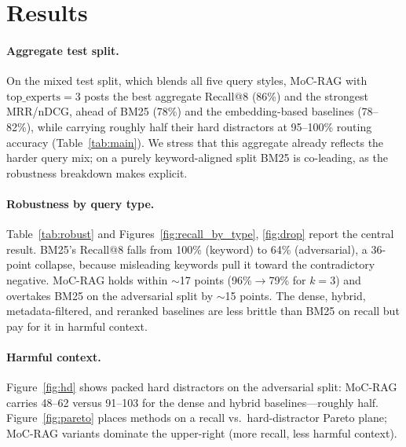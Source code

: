 \section{Results}
\label{sec:results}

\paragraph{Aggregate test split.} On the mixed test split, which blends all five
query styles, MoC-RAG with $\mathrm{top\_experts}{=}3$ posts the best aggregate
Recall@8 (86\%) and the strongest MRR/nDCG, ahead of BM25 (78\%) and the
embedding-based baselines (78--82\%), while carrying roughly half their hard
distractors at
95--100\% routing accuracy (Table~\ref{tab:main}). We stress that this aggregate
already reflects the harder query mix; on a purely keyword-aligned split BM25 is
co-leading, as the robustness breakdown makes explicit.

\begin{table}[t]
  \centering
  \caption{Main benchmark results on the mixed test split (real embedder).
  MoC-RAG rows shaded. HardDistr and Tokens: lower is better.}
  \label{tab:main}
  \resizebox{\textwidth}{!}{}
\end{table}

\paragraph{Robustness by query type.} Table~\ref{tab:robust} and
Figures~\ref{fig:recall_by_type}, \ref{fig:drop} report the central result.
BM25's Recall@8 falls from 100\% (keyword) to 64\% (adversarial), a 36-point
collapse, because misleading keywords pull it toward the contradictory negative.
MoC-RAG holds within $\sim$17 points (96\%$\to$79\% for $k{=}3$) and overtakes
BM25 on the adversarial split by $\sim$15 points. The dense, hybrid,
metadata-filtered, and reranked baselines are less brittle than BM25 on recall
but pay for it in harmful context.

\begin{table}[t]
  \centering
  \caption{Robustness by query type (Recall@8 and Hard Distractors per split;
  $\Delta$ is the keyword$\to$adversarial recall change in points).}
  \label{tab:robust}
  \resizebox{\textwidth}{!}{}
\end{table}

\paragraph{Harmful context.} Figure~\ref{fig:hd} shows packed hard distractors on
the adversarial split: MoC-RAG carries 48--62 versus 91--103 for the dense and
hybrid baselines---roughly half. Figure~\ref{fig:pareto} places methods on a recall vs.\
hard-distractor Pareto plane; MoC-RAG variants dominate the upper-right (more
recall, less harmful context).

